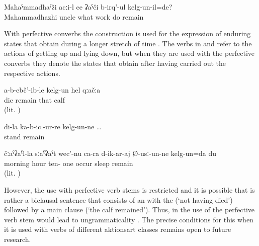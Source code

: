 \begin{exe}
	\ex	\label{ex:‎Which work was uncle Mahammadhazhi doing}
	\gll	Maħaˁmmadħaˁži	acːi-l	ce	ʡaˁči	b-irq'-ul	kelg-un-il=de?	\\
		Mahammadhazhi	uncle	what	work	do	remain\\
	\glt	{}
\end{exe}
%
With perfective converbs the construction is used for the expression of enduring states that obtain during a longer stretch of time . The verbs in  and  refer to the actions of getting up and lying down, but when they are used with the perfective converbs they denote the states that obtain after having carried out the respective actions. 
%
\begin{exe}
	\ex	\label{ex:The calf stayed alive periphrastic}
	\gll	a-b-ebč'-ib-le	kelg-un	hel	qːačːa\\
		die	remain	that	calf\\
	\glt	{} (lit. )

	\ex	\label{ex:‎‎‎Mine (i.e. my stick) remained upright standing}
	\gll	di-la	ka-b-icː-ur-re	kelg-un-ne	\ldots\\
			stand	remain\\
	\glt	{}

	\ex	\label{ex:In the morning, I slept until eleven}
	\gll	čːaˁʡaˁl-la	sːaˁʡaˁt	wec'-nu	ca-ra	d-ik-ar-aj	Ø-usː-un-ne	kelg-un=da	du\\
		morning	hour	ten-	one	occur	sleep		remain	\\
	\glt	{} (lit. )
\end{exe}

However, the use with perfective verb stems is restricted and it is possible that  is rather a biclausal sentence that consists of an  with the  (`not having died') followed by a main clause (`the calf remained'). Thus, in  the use of the perfective verb stem would lead to ungrammaticality . The precise conditions for this  when it is used with verbs of different aktionsart classes  remains open to future research.


